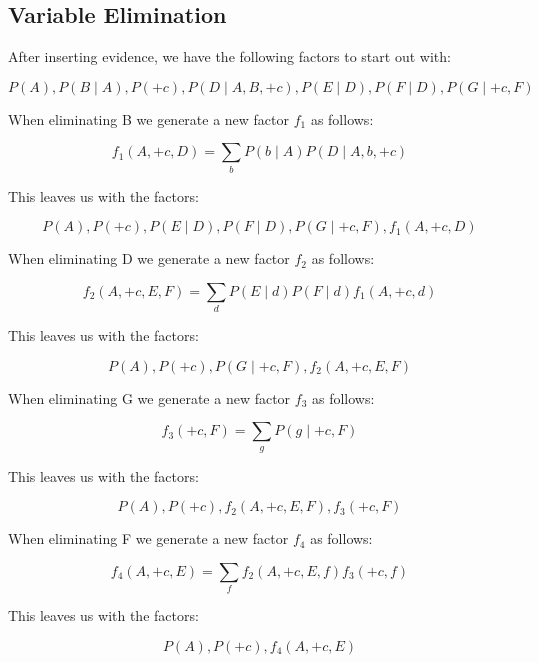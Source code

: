 \documentclass[11pt, answers]{exam}
\begin{document}
\begin{questions}
\section{Variable Elimination}
\question


After inserting evidence, we have the following factors to start out with:


	\begin{solution}
    $$P(A), P(B \mid A), P(+c), P(D \mid A, B,+c), P(E \mid D), P(F \mid D), P(G \mid+c, F)$$
	\end{solution}

When eliminating B we generate a new factor $f_1$ as follows:
	\begin{solution}
	$$f_{1}(A,+c, D)=\sum_{b} P(b \mid A) P(D \mid A, b,+c)$$
	\end{solution}
	
This leaves us with the factors:
	\begin{solution}
	$$P(A), P(+c), P(E \mid D), P(F \mid D), P(G \mid+c, F), f_{1}(A,+c, D)$$
	\end{solution}
\newpage	
When eliminating D we generate a new factor $f_2$ as follows:
	\begin{solution}
	$$f_2(A,+c,E,F) = \sum_{d} P(E \mid d)P(F \mid d)f_{1}(A,+c, d)$$
	\end{solution}
	
This leaves us with the factors:
	\begin{solution}
	$$P(A), P(+c), P(G \mid+c, F), f_2(A,+c,E,F)$$
	\end{solution}
	
When eliminating G we generate a new factor $f_3$ as follows:
	\begin{solution}
	$$f_3(+c,F) = \sum_{g} P(g \mid+c, F)$$
	\end{solution}

This leaves us with the factors:

	\begin{solution}
	$$P(A), P(+c), f_2(A,+c,E,F), f_3(+c,F)$$
	\end{solution}
	
When eliminating F we generate a new factor $f_4$ as follows:

	\begin{solution}
	$$f_4(A,+c,E) = \sum_{f} f_2(A,+c,E,f) f_3(+c,f)$$
	\end{solution}
	
This leaves us with the factors:
	\begin{solution}
	$$P(A), P(+c), f_4(A,+c,E)$$
	\end{solution}
	

\end{questions}
\end{document}
